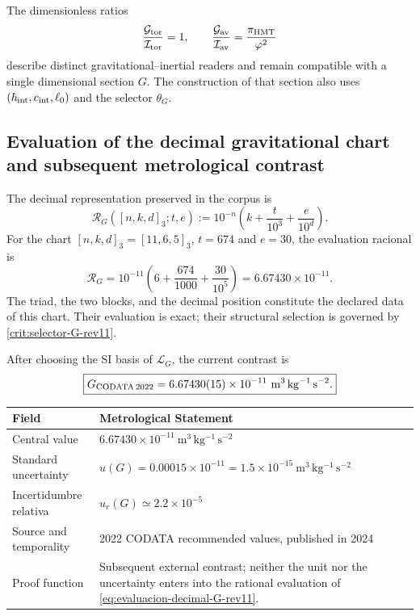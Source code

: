 The dimensionless ratios
\[
 \frac{\mathcal G_{\rm tor}}{\mathcal I_{\rm tor}}=1,
 \qquad
 \frac{\mathcal G_{\rm av}}{\mathcal I_{\rm av}}
 =\frac{\pi_{\rm HMT}}{\varphi^2}
\]
describe distinct gravitational--inertial readers and remain
compatible with a single dimensional section \(G\). The construction of that
section also uses
\((\hbar_{\rm int},c_{\rm int},\ell_0)\) and the selector \(\theta_G\).

\subsection{Evaluation of the decimal gravitational chart and subsequent metrological contrast}

The decimal representation preserved in the corpus is
\begin{equation}
 \mathscr R_G([n,k,d]_3;t,e)
 :=10^{-n}\left(k+\frac{t}{10^3}+\frac{e}{10^d}\right).
 \label{eq:lector-decimal-G-rev11}
\end{equation}
For the chart
\([n,k,d]_3=[11,6,5]_3\), \(t=674\) and \(e=30\), the evaluation racional is
\begin{equation}
 \boxed{
 \mathscr R_G
 =10^{-11}\left(6+\frac{674}{1000}+\frac{30}{10^5}\right)
 =6.67430\times10^{-11}.}
 \label{eq:evaluacion-decimal-G-rev11}
\end{equation}
The triad, the two blocks, and the decimal position constitute the declared
data of this chart. Their evaluation is exact; their structural selection
is governed by \cref{crit:selector-G-rev11}.

After choosing the SI basis of \(\mathcal L_G\), the current contrast is
\begin{equation}
 \boxed{
 G_{\rm CODATA\,2022}=6.67430(15)\times10^{-11}
 \ \mathrm{m^3\,kg^{-1}\,s^{-2}}.}
 \label{eq:G-CODATA-2022-rev11}
\end{equation}

\begin{center}
\begin{tabularx}{0.94\textwidth}{@{}L{0.27\textwidth}Y@{}}
\toprule
Field & Metrological Statement\\
\midrule
Central value &
\(6.67430\times10^{-11}\ \mathrm{m^3\,kg^{-1}\,s^{-2}}\)\\
Standard uncertainty &
\(u(G)=0.00015\times10^{-11}
=1.5\times10^{-15}\ \mathrm{m^3\,kg^{-1}\,s^{-2}}\)\\
Incertidumbre relativa & \(u_r(G)\simeq2.2\times10^{-5}\)\\
Source and temporality &
2022 CODATA recommended values, published in 2024
\cite{CODATA2022}\\
Proof function &
Subsequent external contrast; neither the unit nor the uncertainty enters into
the rational evaluation of \eqref{eq:evaluacion-decimal-G-rev11}.\\
\bottomrule
\end{tabularx}
\end{center}

